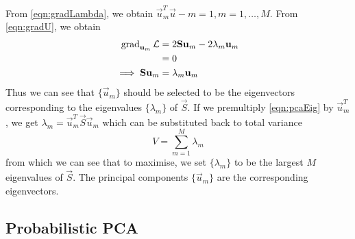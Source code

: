 From \eqref{eqn:gradLambda}, we obtain $\vec u_m^T \vec u-m = 1, m = 1, \dotsc, M$. From \eqref{eqn:gradU}, we obtain
\begin{align}
    \operatorname{\mathrm{grad}}_{\boldsymbol{\mathbf{u}}_m}{\mathcal L}    &= 2 \boldsymbol{\mathbf{S}} \boldsymbol{\mathbf{u}}_m - 2 \lambda_m \boldsymbol{\mathbf{u}}_m \\
                                    &= 0 \\
    \implies \boldsymbol{\mathbf{S}} \boldsymbol{\mathbf{u}}_m        &= \lambda_m \boldsymbol{\mathbf{u}}_m \label{eqn:pcaEig}
\end{align}
Thus we can see that $\{\vec u_m\}$ should be selected to be the eigenvectors corresponding to the eigenvalues $\{\lambda_m\}$ of $\vec S$. If we premultiply \eqref{eqn:pcaEig} by $\vec u_m^T$, we get $\lambda_m = \vec u_m^T \vec S \vec u_m$ which can be substituted back to total variance
\begin{equation*}
    V = \sum_{m = 1}^M \lambda_m
\end{equation*}
from which we can see that to maximise, we set $\{\lambda_m\}$ to be the largest $M$ eigenvalues of $\vec S$. The principal components $\{\vec u_m\}$ are the corresponding eigenvectors.
\subsection{Probabilistic PCA}